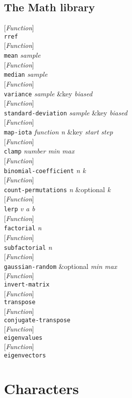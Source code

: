 \documentclass[10pt]{book}
\newenvironment{defother}[2]{[\textit{#1}]\\\texttt{#2}}{\\}
\newenvironment{defun}[1]{\begin{defother}{Function}{#1}}{\end{defother}}
\begin{document}
\section{The Math library}
\begin{defun}{rref}\end{defun}
\begin{defun}{mean} \textit{sample}\end{defun}
\begin{defun}{median} \textit{sample}\end{defun}
\begin{defun}{variance} \textit{sample} \&key \textit{biased}\end{defun}
\begin{defun}{standard-deviation} \textit{sample} \&key \textit{biased}\end{defun}
\begin{defun}{map-iota} \textit{function n} \&key \textit{start step}\end{defun}
\begin{defun}{clamp} \textit{number min max} \end{defun}
\begin{defun}{binomial-coefficient} \textit{n k}\end{defun}
\begin{defun}{count-permutations} \textit{n} \&optional \textit{k}\end{defun}
\begin{defun}{lerp} \textit{v a b}\end{defun}
\begin{defun}{factorial} \textit{n}\end{defun}
\begin{defun}{subfactorial} \textit{n}\end{defun}
\begin{defun}{gaussian-random} \&optional \textit{min max}\end{defun}
\begin{defun}{invert-matrix}\end{defun}
\begin{defun}{transpose}\end{defun}
\begin{defun}{conjugate-transpose}\end{defun}
\begin{defun}{eigenvalues}\end{defun}
\begin{defun}{eigenvectors}\end{defun}
\chapter{Characters}
\end{document}
